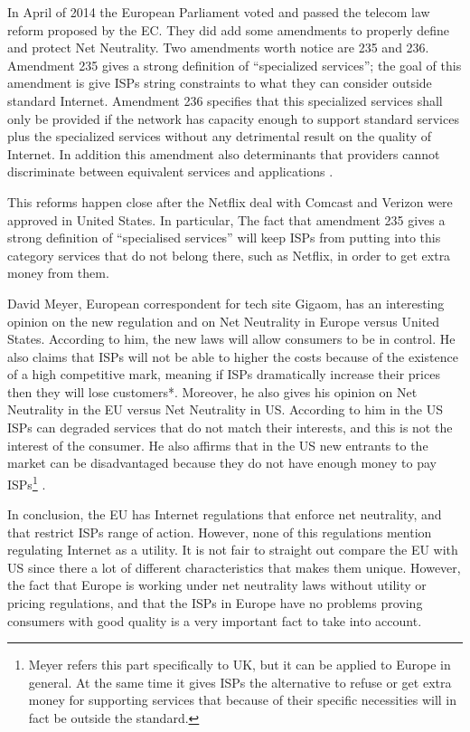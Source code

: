 \documentclass{sigcomm-alternate}
\begin{document}
In April of 2014 the European Parliament voted and passed the telecom law reform proposed by the EC. They did add some amendments to properly define and protect Net Neutrality. Two amendments worth notice are 235 and 236. Amendment 235 gives a strong definition of “specialized services”; the goal of this amendment is give ISPs string constraints to what they can consider outside standard Internet. Amendment 236 specifies that this specialized services shall only be provided if the network has capacity enough to support standard services plus the specialized services without any detrimental result on the quality of Internet. In addition this amendment also determinants that providers cannot discriminate between equivalent services and applications \cite{gigaom}.

This reforms happen close after the Netflix deal with Comcast and Verizon were approved in United States. In particular, The fact that amendment 235 gives a strong definition of “specialised services” will keep ISPs from putting into this category services that do not belong there, such as Netflix, in order to get extra money from them.

David Meyer, European correspondent for tech site Gigaom, has an interesting opinion on the new regulation and on Net Neutrality in Europe versus United States. According to him, the new laws will allow consumers to be in control. He also claims that ISPs will not be able to higher the costs because of the existence of a high competitive mark, meaning if ISPs dramatically increase their prices then they will lose customers*. Moreover, he also gives his opinion on Net Neutrality in the EU versus Net Neutrality in US. According to him in the US ISPs can degraded services that do not match their interests, and this is not the interest of the consumer. He also affirms that in the US new entrants to the market can be disadvantaged because they do not have enough money to pay ISPs\footnote{Meyer refers this part specifically to UK, but it can be applied to Europe in general.  At the same time it gives ISPs the alternative to refuse or get extra money for supporting services that because of their specific necessities will in fact be outside the standard.} \cite{inthenews}.


In conclusion, the EU has Internet regulations that enforce net neutrality, and that restrict ISPs range of action. However, none of this regulations mention regulating Internet as a utility. It is not fair to straight out compare the EU with US since there a lot of different characteristics that makes them unique. However, the fact that Europe is working under net neutrality laws without utility or pricing regulations, and that the ISPs in Europe have no problems proving consumers with good quality  is a very important fact to take into account.
\end{document}
